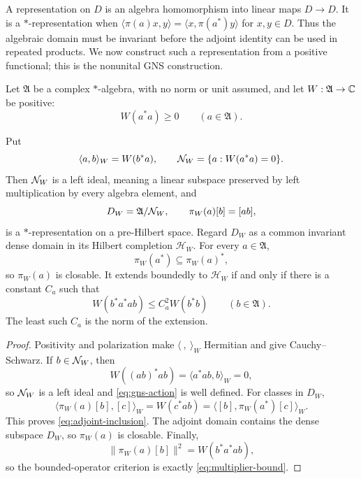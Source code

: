 A representation on $D$ is an algebra homomorphism into linear maps
$D\to D$.  It is a $*$-representation when
$\langle\pi(a)x,y\rangle=\langle x,\pi(a^*)y\rangle$ for $x,y\in D$.
Thus the algebraic domain must be invariant before the adjoint identity
can be used in repeated products.  We now construct such a representation
from a positive functional; this is the nonunital GNS construction.

Let $\mathfrak A$ be a complex $*$-algebra, with no norm or unit assumed,
and let $W:\mathfrak A\to\mathbb C$ be positive:
\[
 W(a^*a)\geq0\qquad(a\in\mathfrak A).
\]

\begin{theorem}
\label{thm:gns}
Put
\[
 \langle a,b\rangle_W=W(b^*a),
 \qquad
 \mathcal N_W=\{a:W(a^*a)=0\}.
\]
Then $\mathcal N_W$ is a left ideal, meaning a linear subspace preserved by
left multiplication by every algebra element, and
\begin{equation}
 D_W=\mathfrak A/\mathcal N_W,
 \qquad
 \pi_W(a)[b]=[ab],
 \label{eq:gns-action}
\end{equation}
is a $*$-representation on a pre-Hilbert space.  Regard $D_W$ as a
common invariant dense domain in its Hilbert completion $\mathcal H_W$.
For every $a\in\mathfrak A$,
\begin{equation}
 \pi_W(a^*)\subseteq\pi_W(a)^*,
 \label{eq:adjoint-inclusion}
\end{equation}
so $\pi_W(a)$ is closable.  It extends boundedly to $\mathcal H_W$ if
and only if there is a constant $C_a$ such that
\begin{equation}
 W(b^*a^*ab)\leq C_a^2W(b^*b)
 \qquad(b\in\mathfrak A).
 \label{eq:multiplier-bound}
\end{equation}
The least such $C_a$ is the norm of the extension.
\end{theorem}

\begin{proof}
Positivity and polarization make $\langle\ ,\ \rangle_W$ Hermitian and
give Cauchy--Schwarz.  If $b\in\mathcal N_W$, then
\[
 W((ab)^*ab)=\langle a^*ab,b\rangle_W=0,
\]
so $\mathcal N_W$ is a left ideal and \eqref{eq:gns-action} is well defined.
For classes in $D_W$,
\[
 \langle\pi_W(a)[b],[c]\rangle_W
 =W(c^*ab)
 =\langle[b],\pi_W(a^*)[c]\rangle_W.
\]
This proves \eqref{eq:adjoint-inclusion}.  The adjoint domain contains
the dense subspace $D_W$, so $\pi_W(a)$ is closable.  Finally,
\[
 \|\pi_W(a)[b]\|^2=W(b^*a^*ab),
\]
so the bounded-operator criterion is exactly
\eqref{eq:multiplier-bound}.
\end{proof}

